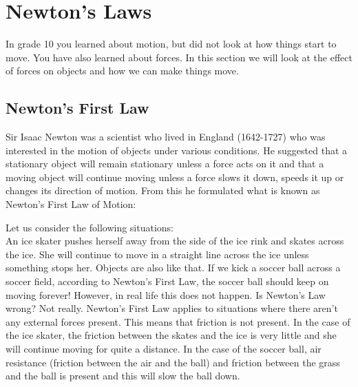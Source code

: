 \section{Newton's Laws}
In grade 10 you learned about motion, but did not look at how things start to move. You have also learned about forces. In this section we will look at the effect of forces on objects and how we can make things move.

\subsection{Newton's First Law}
Sir Isaac Newton was a scientist who lived in England (1642-1727) who was interested in the motion of objects under various conditions. He suggested that a stationary object will remain stationary unless a force acts on it and that a moving object will continue moving unless a force slows it down, speeds it up or changes its direction of motion. From this he formulated what is known as Newton's First Law of Motion:


Let us consider the following situations:\\

An ice skater pushes herself away from the side of the ice rink and skates across the ice. She will continue to move in a straight line across the ice unless something stops her. Objects are also like that. If we kick a soccer ball across a soccer field, according to Newton's First Law, the soccer ball should keep on moving forever! However, in real life this does not happen. Is Newton's Law wrong? Not really. Newton's First Law applies to situations where there aren't any external forces present. This means that friction is not present. In the case of the ice skater, the friction between the skates and the ice is very little and she will continue moving for quite a distance. In the case of the soccer ball, air resistance (friction between the air and the ball) and friction between the grass and the ball is present and this will slow the ball down.

